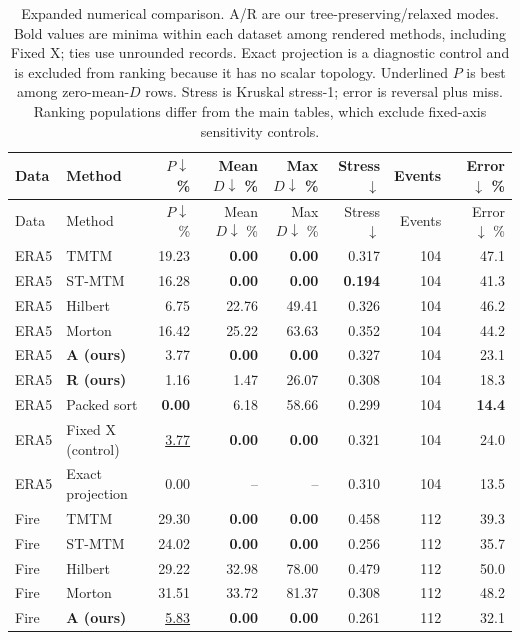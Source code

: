 \begingroup\small\setlength{\tabcolsep}{3pt}
\begin{longtable}{llrrrrrr}
\caption{Expanded numerical comparison. A/R are our tree-preserving/relaxed modes. Bold values are minima within each dataset among rendered methods, including Fixed X; ties use unrounded records. Exact projection is a diagnostic control and is excluded from ranking because it has no scalar topology. Underlined $P$ is best among zero-mean-$D$ rows. Stress is Kruskal stress-1; error is reversal plus miss. Ranking populations differ from the main tables, which exclude fixed-axis sensitivity controls.}\\\toprule
Data & Method & $P\downarrow$ \% & Mean $D\downarrow$ \% & Max $D\downarrow$ \% & Stress $\downarrow$ & Events & Error $\downarrow$ \%\\\midrule\endfirsthead
\toprule Data & Method & $P\downarrow$ \% & Mean $D\downarrow$ \% & Max $D\downarrow$ \% & Stress $\downarrow$ & Events & Error $\downarrow$ \%\\\midrule\endhead
\bottomrule\endfoot
ERA5 & TMTM & 19.23 & \textbf{0.00} & \textbf{0.00} & 0.317 & 104 & 47.1\\
ERA5 & ST-MTM & 16.28 & \textbf{0.00} & \textbf{0.00} & \textbf{0.194} & 104 & 41.3\\
ERA5 & Hilbert & 6.75 & 22.76 & 49.41 & 0.326 & 104 & 46.2\\
ERA5 & Morton & 16.42 & 25.22 & 63.63 & 0.352 & 104 & 44.2\\
ERA5 & \textbf{A (ours)} & 3.77 & \textbf{0.00} & \textbf{0.00} & 0.327 & 104 & 23.1\\
ERA5 & \textbf{R (ours)} & 1.16 & 1.47 & 26.07 & 0.308 & 104 & 18.3\\
ERA5 & Packed sort & \textbf{0.00} & 6.18 & 58.66 & 0.299 & 104 & \textbf{14.4}\\
ERA5 & Fixed X (control) & \underline{3.77} & \textbf{0.00} & \textbf{0.00} & 0.321 & 104 & 24.0\\
ERA5 & Exact projection & 0.00 & -- & -- & 0.310 & 104 & 13.5\\
Fire & TMTM & 29.30 & \textbf{0.00} & \textbf{0.00} & 0.458 & 112 & 39.3\\
Fire & ST-MTM & 24.02 & \textbf{0.00} & \textbf{0.00} & 0.256 & 112 & 35.7\\
Fire & Hilbert & 29.22 & 32.98 & 78.00 & 0.479 & 112 & 50.0\\
Fire & Morton & 31.51 & 33.72 & 81.37 & 0.308 & 112 & 48.2\\
Fire & \textbf{A (ours)} & \underline{5.83} & \textbf{0.00} & \textbf{0.00} & 0.261 & 112 & 32.1\\

\end{longtable}
